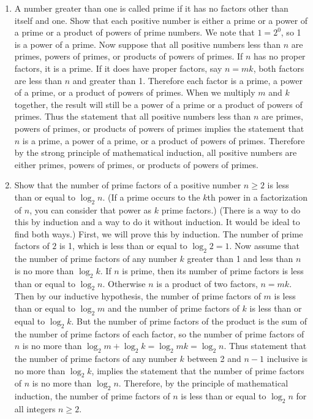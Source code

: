 \documentclass[10pt,]{book}
\theoremstyle{plain}
\theoremstyle{definition}
\numberwithin{equation}{chapter}
\begin{document}
\begin{enumerate}
{\setcounter{enumi}{\value{problemnumber}}} \item\hypertarget{li-25}{}A number greater than one is called prime if it has no factors other than itself and one. Show that each positive number is either a prime or a power of a prime or a product of powers of prime numbers. We note that \(1=2^0\), so 1 is a power of a prime. Now suppose that all positive numbers less than \(n\) are primes, powers of primes, or products of powers of primes. If \(n\) has no proper factors, it is a prime. If it does have proper factors, say \(n=mk\), both factors are less than \(n\) and greater than 1. Therefore each factor is a prime, a power of a prime, or a product of powers of primes. When we multiply \(m\) and \(k\) together, the result will still be a power of a prime or a product of powers of primes. Thus the statement that all positive numbers less than \(n\) are primes, powers of primes, or products of powers of primes implies the statement that \(n\) is a prime, a power of a prime, or a product of powers of primes. Therefore by the strong principle of mathematical induction, all positive numbers are either primes, powers of primes, or products of powers of primes.%
%
\item\hypertarget{li-26}{}Show that the number of prime factors of a positive number \(n\ge 2\) is less than or equal to \(\log_2 n\).  (If a prime occurs to the \(k\)th power in a factorization of \(n\), you can consider that power as \(k\) prime factors.)  (There is a way to do this by induction and a way to do it without induction.  It would be ideal to find both ways.) First, we will prove this by induction. The number of prime factors of \(2\) is 1, which is less than or equal to \(\log_2 2=1\). Now assume that the number of prime factors of any number \(k\) greater than 1 and less than \(n\) is no more than \(\log_2 k\). If \(n\) is prime, then its number of prime factors is less than or equal to \(\log_2 n\). Otherwise \(n\) is a product of two factors, \(n=mk\). Then by our inductive hypothesis, the number of prime factors of \(m\) is less than or equal to \(\log_2 m\) and the number of prime factors of \(k\) is less than or equal to \(\log_2 k\). But the number of prime factors of the product is the sum of the number of prime factors of each factor, so the number of prime factors of \(n\) is no more than \(\log_2 m +\log_2 k=\log_2 mk= \log_2 n\). Thus statement that the number of prime factors of any number \(k\) between 2 and \(n-1\) inclusive is no more than \(\log_2 k\), implies the statement that the number of prime factors of \(n\) is no more than \(\log_2 n\). Therefore, by the principle of mathematical induction, the number of prime factors of \(n\) is less than or equal to \(\log_2 n\) for all integers \(n\ge 2\).%

\end{enumerate}
\end{document}

